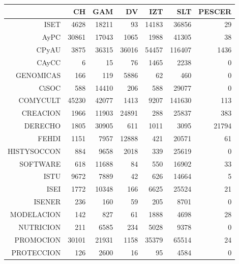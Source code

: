\begin{table}[ht]
\centering
\begin{tabular}{rrrrrrr}
  \hline
 & CH & GAM & DV & IZT & SLT & PESCER \\ 
  \hline
ISET & 4628 & 18211 &  93 & 14183 & 36856 &  29 \\ 
  AyPC & 30861 & 17043 & 1065 & 1988 & 41305 &  38 \\ 
  CPyAU & 3875 & 36315 & 36016 & 54457 & 116407 & 1436 \\ 
  CAyCC &   6 &  15 &  76 & 1465 & 2238 &   0 \\ 
  GENOMICAS & 166 & 119 & 5886 &  62 & 460 &   0 \\ 
  CiSOC & 588 & 14410 & 206 & 588 & 29077 &   0 \\ 
  COMYCULT & 45230 & 42077 & 1413 & 9207 & 141630 & 113 \\ 
  CREACION & 1966 & 11903 & 24891 & 288 & 25837 & 383 \\ 
  DERECHO & 1805 & 30905 & 611 & 1011 & 3095 & 21794 \\ 
  FEHDI & 1151 & 7957 & 12888 & 421 & 20571 &  61 \\ 
  HISTYSOCCON & 884 & 9658 & 2018 & 339 & 25619 &   0 \\ 
  SOFTWARE & 618 & 11688 &  84 & 550 & 16902 &  33 \\ 
  ISTU & 9672 & 7889 &  42 & 626 & 14664 &   5 \\ 
  ISEI & 1772 & 10348 & 166 & 6625 & 25524 &  21 \\ 
  ISENER & 236 & 160 &  59 & 205 & 8701 &   0 \\ 
  MODELACION & 142 & 827 &  61 & 1888 & 4698 &  28 \\ 
  NUTRICION & 211 & 6585 & 234 & 5028 & 9378 &   0 \\ 
  PROMOCION & 30101 & 21931 & 1158 & 35379 & 65514 &  24 \\ 
  PROTECCION & 126 & 2600 &  16 &  95 & 4584 &   0 \\ 
   \hline
\end{tabular}
\end{table}
